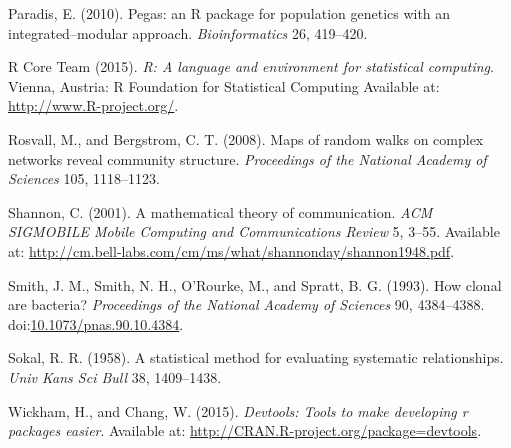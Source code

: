 \documentclass{frontiersSCNS} %
\begin{document}
Paradis, E. (2010). Pegas: an R package for population genetics with an
integrated--modular approach. \emph{Bioinformatics} 26, 419--420.

R Core Team (2015). \emph{R: A language and environment for statistical
computing}. Vienna, Austria: R Foundation for Statistical Computing
Available at: \url{http://www.R-project.org/}.

Rosvall, M., and Bergstrom, C. T. (2008). Maps of random walks on
complex networks reveal community structure. \emph{Proceedings of the
National Academy of Sciences} 105, 1118--1123.

Shannon, C. (2001). A mathematical theory of communication. \emph{ACM
SIGMOBILE Mobile Computing and Communications Review} 5, 3--55.
Available at:
\url{http://cm.bell-labs.com/cm/ms/what/shannonday/shannon1948.pdf}.

Smith, J. M., Smith, N. H., O'Rourke, M., and Spratt, B. G. (1993). How
clonal are bacteria? \emph{Proceedings of the National Academy of
Sciences} 90, 4384--4388.
doi:\href{http://dx.doi.org/10.1073/pnas.90.10.4384}{10.1073/pnas.90.10.4384}.

Sokal, R. R. (1958). A statistical method for evaluating systematic
relationships. \emph{Univ Kans Sci Bull} 38, 1409--1438.

Wickham, H., and Chang, W. (2015). \emph{Devtools: Tools to make
developing r packages easier}. Available at:
\url{http://CRAN.R-project.org/package=devtools}.
\end{document}
